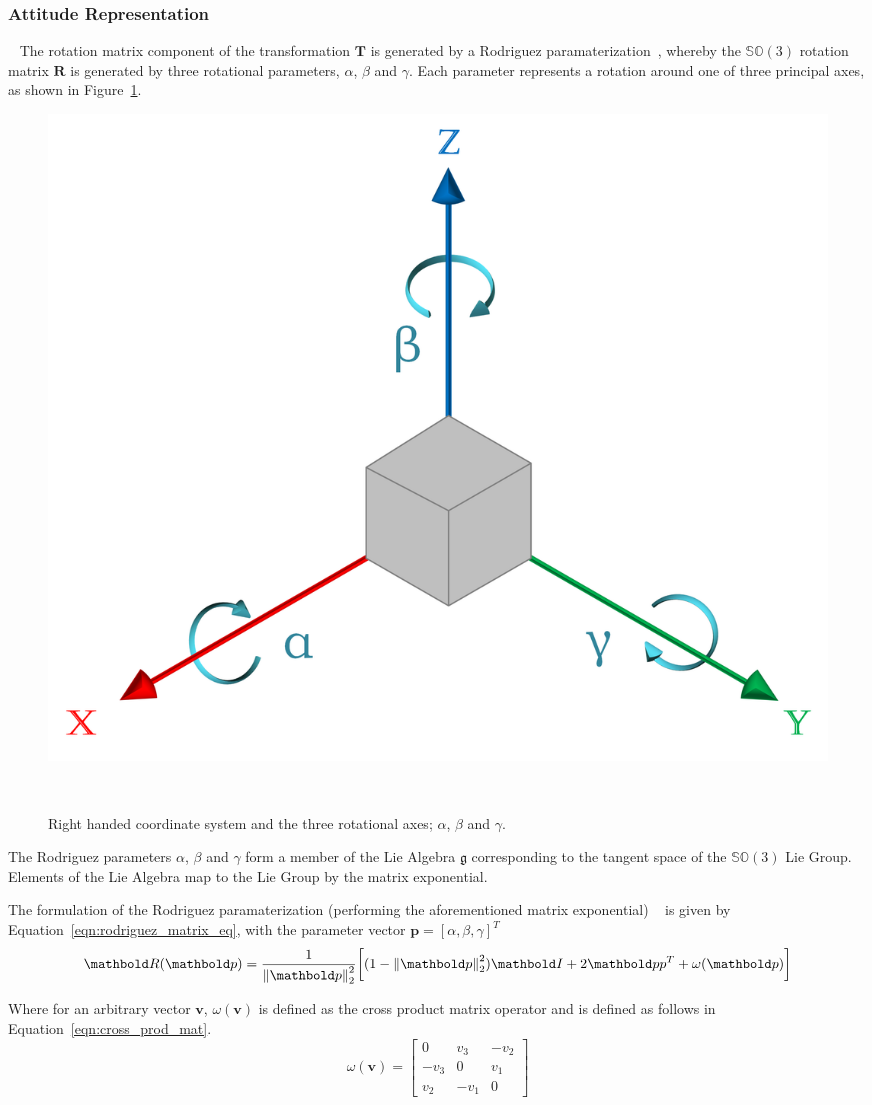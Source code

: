 \subsubsection{Attitude Representation}
~\label{subsub:moseg_static_camera_attitude}
The rotation matrix component of the transformation \(\bm{T}\) is
generated by a Rodriguez paramaterization~\cite{Shuster1993}, whereby the
\(\mathbb{SO}(3)\) rotation matrix \(\bm{R}\) is generated by three rotational
parameters, \( \alpha \), \( \beta \) and \( \gamma \). Each parameter represents a 
rotation around one of three principal axes, as shown in Figure~\ref{figure:euler_axes}.
\begin{figure}[!htbp]
  \centering
  \includegraphics[width=.5\linewidth]{figures/moseg/euler_angles.png}
  \caption[Rotational Axes]{Right handed coordinate system and the three rotational axes; 
  \( \alpha \), \( \beta \) and \( \gamma \).}
~\label{figure:euler_axes}
\end{figure}
The Rodriguez parameters \( \alpha \), \( \beta \) and \( \gamma \) form a member of the Lie Algebra 
\( \mathfrak{g} \) corresponding to the tangent space of the \( \mathbb{SO}(3) \) Lie Group. Elements 
of the Lie Algebra map to the Lie Group by the matrix exponential.

The formulation of the Rodriguez paramaterization (performing the aforementioned matrix exponential)
~\cite{Shuster1993} is given by Equation~\ref{eqn:rodriguez_matrix_eq}, with the parameter vector
\(\bm{p} = {[\alpha, \beta, \gamma]}^{T}\)
\begin{equation}
  \label{eqn:rodriguez_matrix_eq}
  \bm{R}(\bm{p}) =
  \frac{1}{\norm{\bm{p}}^{2}}
  \bigg[
  (1 - \norm{\bm{p}}^{2})\bm{I} +
  2 \bm{pp}^{T} + \omega(\bm{p})
  \bigg]
\end{equation}

Where for an arbitrary vector \(\bm{v}\), \(\omega(\bm{v})\) is defined as
the cross product matrix operator and is defined as follows in Equation~\ref{eqn:cross_prod_mat}.
\begin{equation}
  \label{eqn:cross_prod_mat}
  \omega(\bm{v}) =
  \begin{bmatrix}
    0 & v_{3} & -v_{2} \\
    -v_{3} & 0 & v_{1} \\
    v_{2} & -v_{1} & 0
  \end{bmatrix}
\end{equation}

